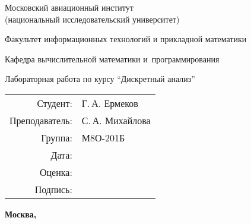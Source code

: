 \begin{titlepage}
\begin{center}
\bfseries

{\Large Московский авиационный институт\\ (национальный исследовательский университет)

}

\vspace{48pt}

{\large Факультет информационных технологий и прикладной математики
}

\vspace{36pt}

{\large Кафедра вычислительной математики и~программирования

}


\vspace{48pt}

Лабораторная работа  по курсу \enquote{Дискретный анализ}

\end{center}

\vspace{72pt}

\begin{flushright}
\begin{tabular}{rl}
Студент: & Г.\,А. Ермеков \\
Преподаватель: & С.\,А. Михайлова \\
Группа: & М8О-201Б \\
Дата: & \\
Оценка: & \\
Подпись: & \\
\end{tabular}
\end{flushright}

\vfill

\begin{center}
\bfseries
Москва, \the\year
\end{center}
\end{titlepage}

\pagebreak
